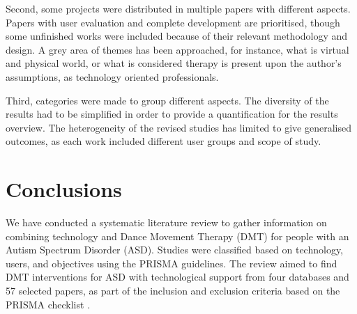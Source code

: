 \documentclass[a4paper,fleqn]{cas-sc}
\begin{document}
Second, some projects were distributed in multiple papers with different aspects. Papers with user evaluation and complete development are prioritised, though some unfinished works were included because of their relevant methodology and design. A grey area of themes has been approached, for instance, what is virtual and physical world, or what is considered therapy is present upon the author's assumptions, as technology oriented professionals.

Third, categories were made to group different aspects. The diversity of the results had to be simplified in order to provide a quantification for the results overview. The heterogeneity of the revised studies has limited to give generalised outcomes, as each work included different user groups and scope of study.


\section{Conclusions}
\label{sec6:conclusion}
We have conducted a systematic literature review to gather information on combining technology and Dance Movement Therapy (DMT) for people with an Autism Spectrum Disorder (ASD). Studies were classified based on technology, users, and objectives using the PRISMA guidelines. The review aimed to find DMT interventions for ASD with technological support from four databases and 57 selected papers, as part of the inclusion and exclusion criteria based on the PRISMA checklist \cite{Pagen71}.


\end{document}
